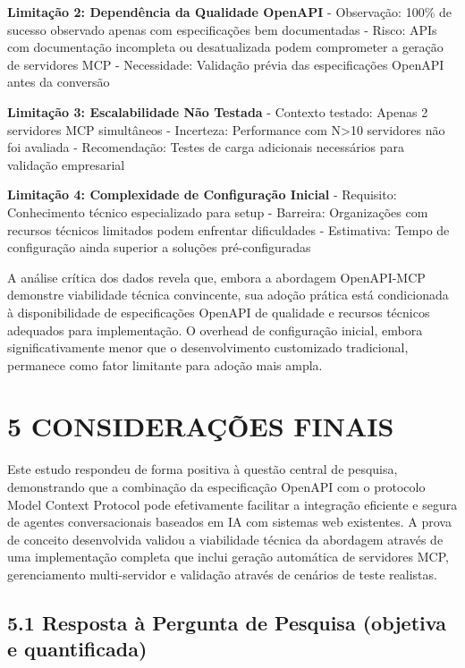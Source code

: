 \documentclass[
]{article}
\begin{document}
\textbf{Limitação 2: Dependência da Qualidade OpenAPI} - Observação:
100\% de sucesso observado apenas com especificações bem documentadas -
Risco: APIs com documentação incompleta ou desatualizada podem
comprometer a geração de servidores MCP - Necessidade: Validação prévia
das especificações OpenAPI antes da conversão

\textbf{Limitação 3: Escalabilidade Não Testada} - Contexto testado:
Apenas 2 servidores MCP simultâneos - Incerteza: Performance com
N\textgreater10 servidores não foi avaliada - Recomendação: Testes de
carga adicionais necessários para validação empresarial

\textbf{Limitação 4: Complexidade de Configuração Inicial} - Requisito:
Conhecimento técnico especializado para setup - Barreira: Organizações
com recursos técnicos limitados podem enfrentar dificuldades -
Estimativa: Tempo de configuração ainda superior a soluções
pré-configuradas

A análise crítica dos dados revela que, embora a abordagem OpenAPI-MCP
demonstre viabilidade técnica convincente, sua adoção prática está
condicionada à disponibilidade de especificações OpenAPI de qualidade e
recursos técnicos adequados para implementação. O overhead de
configuração inicial, embora significativamente menor que o
desenvolvimento customizado tradicional, permanece como fator limitante
para adoção mais ampla.

\section{5 CONSIDERAÇÕES FINAIS}\label{considerauxe7uxf5es-finais}

Este estudo respondeu de forma positiva à questão central de pesquisa,
demonstrando que a combinação da especificação OpenAPI com o protocolo
Model Context Protocol pode efetivamente facilitar a integração
eficiente e segura de agentes conversacionais baseados em IA com
sistemas web existentes. A prova de conceito desenvolvida validou a
viabilidade técnica da abordagem através de uma implementação completa
que inclui geração automática de servidores MCP, gerenciamento
multi-servidor e validação através de cenários de teste realistas.

\subsection{5.1 Resposta à Pergunta de Pesquisa (objetiva e
quantificada)}\label{resposta-uxe0-pergunta-de-pesquisa-objetiva-e-quantificada}
\end{document}

